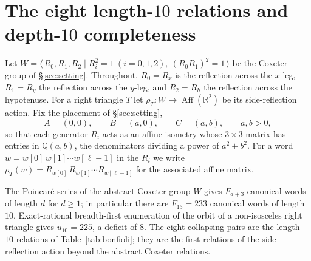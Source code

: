 \documentclass[11pt]{article}
\theoremstyle{plain}
\theoremstyle{definition}
\theoremstyle{remark}
\begin{document}
\section{The eight length-\texorpdfstring{$10$}{10} relations and depth-\texorpdfstring{$10$}{10} completeness}
\label{sec:bonfioli}

Let $W = \langle\, R_0, R_1, R_2 \mid R_i^2 = 1\ (i=0,1,2),\ (R_0R_1)^2 = 1 \,\rangle$
be the Coxeter group of \S\ref{sec:setting}. Throughout, $R_0 = R_x$ is the
reflection across the $x$-leg, $R_1 = R_y$ the reflection across the $y$-leg,
and $R_2 = R_h$ the reflection across the hypotenuse. For a right triangle $T$
let $\rho_T \colon W \to \operatorname{Aff}(\mathbb{R}^2)$ be its side-reflection
action. Fix the placement of \S\ref{sec:setting},
\[
A = (0,0), \qquad B = (a,0), \qquad C = (a,b), \qquad a, b > 0,
\]
so that each generator $R_i$ acts as an affine isometry whose $3\times 3$ matrix
has entries in $\mathbb{Q}(a,b)$, the denominators dividing a power of $a^2+b^2$.
For a word $w = w[0]\,w[1]\cdots w[\ell-1]$ in the $R_i$ we write
$\rho_T(w) = R_{w[0]}\,R_{w[1]}\cdots R_{w[\ell-1]}$ for the associated affine matrix.

The Poincar\'e series of the abstract Coxeter group $W$ gives
$F_{d+3}$ canonical words of length $d$ for $d \ge 1$; in particular there are
$F_{13} = 233$ canonical words of length $10$. Exact-rational breadth-first
enumeration of the orbit of a non-isosceles right triangle gives $u_{10} = 225$,
a deficit of $8$. The eight collapsing pairs are the length-$10$ relations of
Table~\ref{tab:bonfioli}; they are the first relations of the side-reflection
action beyond the abstract Coxeter relations.
\end{document}
